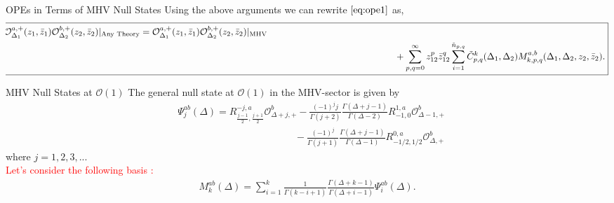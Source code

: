 \documentclass[final]{beamer}
\newlength{\colwidth}
\begin{document}
\begin{frame}[t]
\begin{columns}[t]
		\begin{column}{\colwidth}
		\begin{block}{OPEs in Terms of MHV Null States}
				Using the above arguments we can rewrite $\eqref{eq:ope1}$ as,
			\begin{equation}
				\label{eq:ope2}
				\hspace{-2mm}\boxed{
					\begin{split}
						&\mathcal{O}^{a,+}_{\Delta_{1}}(z_{1},\bar{z}_{1}) \mathcal{O}^{b,+}_{\Delta_{2}}(z_{2},\bar{z}_{2})|_{\textrm{Any Theory}}=\mathcal{O}^{a,+}_{\Delta_{1}}(z_{1},\bar{z}_{1}) \mathcal{O}^{b,+}_{\Delta_{2}}(z_{2},\bar{z}_{2})|_{\textrm{MHV}}\\
						& \hspace{15cm} +\sum_{p,q=0}^{\infty}z^{p}_{12}\bar{z}^{q}_{12}\sum_{i=1}^{\tilde{n}_{p,q}}\tilde{C}^{k}_{p,q}(\Delta_{1},\Delta_{2})M^{a,b}_{k,p,q}(\Delta_1,\Delta_2,z_{2},\bar{z}_{2}).
				\end{split}}
			\end{equation}
		\end{block}
		\begin{block}{MHV Null States at $\mathcal{O}(1)$}
				The general null state at $\mathcal{O}(1)$ in the MHV-sector is given by
			\begin{equation}
				\label{eq:mhv1}
				\begin{split}
					&\Psi^{ab}_{j}(\Delta)=R^{-j,a}_{\frac{j-1}{2},\frac{j+1}{2}}\mathcal{O}^{b}_{\Delta+j,+}-\frac{(-1)^{j}j}{\Gamma(j+2)}\frac{\Gamma(\Delta+j-1)}{\Gamma(\Delta-2)}R^{1,a}_{-1,0}\mathcal{O}^{b}_{\Delta-1,+}
					\\
					&\hspace{5cm}
					-\frac{(-1)^{j}}{\Gamma(j+1)}\frac{\Gamma(\Delta+j-1)}{\Gamma(\Delta-1)}R^{0,a}_{-1/2,1/2}\mathcal{O}^{b}_{\Delta,+}
				\end{split}
			\end{equation}
			where $j=1,2,3,...$
			\vspace{2mm}\\
			\textcolor{red}{Let's consider the following basis :}
			\begin{equation}
				\label{eq:mhv2}
				\begin{split}
					M^{ab}_{k}(\Delta)= \sum_{i=1}^{k} \frac{1}{\Gamma(k-i+1)} \frac{\Gamma(\Delta+k-1)}{\Gamma(\Delta+i-1)}\Psi^{ab}_{i}(\Delta).
				\end{split}
			\end{equation}
		

\end{block}
\end{column}
\end{columns}
\end{frame}
\end{document}
